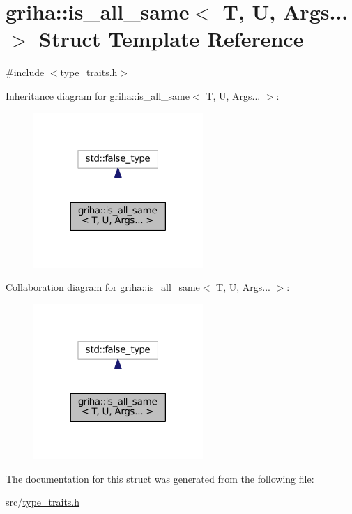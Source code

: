\hypertarget{structgriha_1_1is__all__same_3_01_t_00_01_u_00_01_args_8_8_8_01_4}{}\section{griha\+:\+:is\+\_\+all\+\_\+same$<$ T, U, Args... $>$ Struct Template Reference}
\label{structgriha_1_1is__all__same_3_01_t_00_01_u_00_01_args_8_8_8_01_4}


{\ttfamily \#include $<$type\+\_\+traits.\+h$>$}



Inheritance diagram for griha\+:\+:is\+\_\+all\+\_\+same$<$ T, U, Args... $>$\+:
\nopagebreak
\begin{figure}[H]
\begin{center}
\leavevmode
\includegraphics[width=182pt]{structgriha_1_1is__all__same_3_01_t_00_01_u_00_01_args_8_8_8_01_4__inherit__graph}
\end{center}
\end{figure}


Collaboration diagram for griha\+:\+:is\+\_\+all\+\_\+same$<$ T, U, Args... $>$\+:
\nopagebreak
\begin{figure}[H]
\begin{center}
\leavevmode
\includegraphics[width=182pt]{structgriha_1_1is__all__same_3_01_t_00_01_u_00_01_args_8_8_8_01_4__coll__graph}
\end{center}
\end{figure}


The documentation for this struct was generated from the following file\+:\begin{DoxyCompactItemize}
\item 
src/\hyperlink{type__traits_8h}{type\+\_\+traits.\+h}\end{DoxyCompactItemize}
